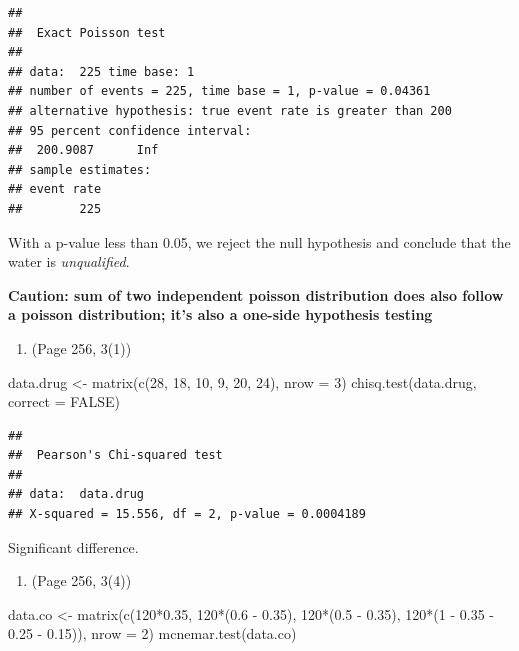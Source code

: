 \documentclass{article}
\newenvironment{Shaded}{\begin{snugshade}}{\end{snugshade}}
\newcommand{\AttributeTok}[1]{\textcolor[rgb]{0.77,0.63,0.00}{#1}}
\newcommand{\ConstantTok}[1]{\textcolor[rgb]{0.00,0.00,0.00}{#1}}
\newcommand{\DecValTok}[1]{\textcolor[rgb]{0.00,0.00,0.81}{#1}}
\newcommand{\FloatTok}[1]{\textcolor[rgb]{0.00,0.00,0.81}{#1}}
\newcommand{\FunctionTok}[1]{\textcolor[rgb]{0.00,0.00,0.00}{#1}}
\newcommand{\NormalTok}[1]{#1}
\newcommand{\OtherTok}[1]{\textcolor[rgb]{0.56,0.35,0.01}{#1}}
\newcommand{\SpecialCharTok}[1]{\textcolor[rgb]{0.00,0.00,0.00}{#1}}
\begin{document}
\begin{verbatim}
## 
##  Exact Poisson test
## 
## data:  225 time base: 1
## number of events = 225, time base = 1, p-value = 0.04361
## alternative hypothesis: true event rate is greater than 200
## 95 percent confidence interval:
##  200.9087      Inf
## sample estimates:
## event rate 
##        225
\end{verbatim}

With a p-value less than 0.05, we reject the null hypothesis and
conclude that the water is \emph{unqualified}.

\textbf{Caution: sum of two independent poisson distribution does also follow a poisson distribution; it's also a one-side hypothesis testing}

\begin{enumerate}
\def\labelenumi{\arabic{enumi}.}
\setcounter{enumi}{2}
\tightlist
\item
  (Page 256, 3(1))
\end{enumerate}

\begin{Shaded}
\begin{Highlighting}[]
\NormalTok{data.drug }\OtherTok{\textless{}{-}} \FunctionTok{matrix}\NormalTok{(}\FunctionTok{c}\NormalTok{(}\DecValTok{28}\NormalTok{, }\DecValTok{18}\NormalTok{, }\DecValTok{10}\NormalTok{, }\DecValTok{9}\NormalTok{, }\DecValTok{20}\NormalTok{, }\DecValTok{24}\NormalTok{), }\AttributeTok{nrow =} \DecValTok{3}\NormalTok{)}
\FunctionTok{chisq.test}\NormalTok{(data.drug, }\AttributeTok{correct =} \ConstantTok{FALSE}\NormalTok{)}
\end{Highlighting}
\end{Shaded}

\begin{verbatim}
## 
##  Pearson's Chi-squared test
## 
## data:  data.drug
## X-squared = 15.556, df = 2, p-value = 0.0004189
\end{verbatim}

Significant difference.

\begin{enumerate}
\def\labelenumi{\arabic{enumi}.}
\setcounter{enumi}{3}
\tightlist
\item
  (Page 256, 3(4))
\end{enumerate}

\begin{Shaded}
\begin{Highlighting}[]
\NormalTok{data.co }\OtherTok{\textless{}{-}} \FunctionTok{matrix}\NormalTok{(}\FunctionTok{c}\NormalTok{(}\DecValTok{120}\SpecialCharTok{*}\FloatTok{0.35}\NormalTok{, }\DecValTok{120}\SpecialCharTok{*}\NormalTok{(}\FloatTok{0.6} \SpecialCharTok{{-}} \FloatTok{0.35}\NormalTok{), }
                    \DecValTok{120}\SpecialCharTok{*}\NormalTok{(}\FloatTok{0.5} \SpecialCharTok{{-}} \FloatTok{0.35}\NormalTok{), }\DecValTok{120}\SpecialCharTok{*}\NormalTok{(}\DecValTok{1} \SpecialCharTok{{-}} \FloatTok{0.35} \SpecialCharTok{{-}} \FloatTok{0.25} \SpecialCharTok{{-}} \FloatTok{0.15}\NormalTok{)), }
                  \AttributeTok{nrow =} \DecValTok{2}\NormalTok{)}
\FunctionTok{mcnemar.test}\NormalTok{(data.co)}
\end{Highlighting}
\end{Shaded}
\end{document}
